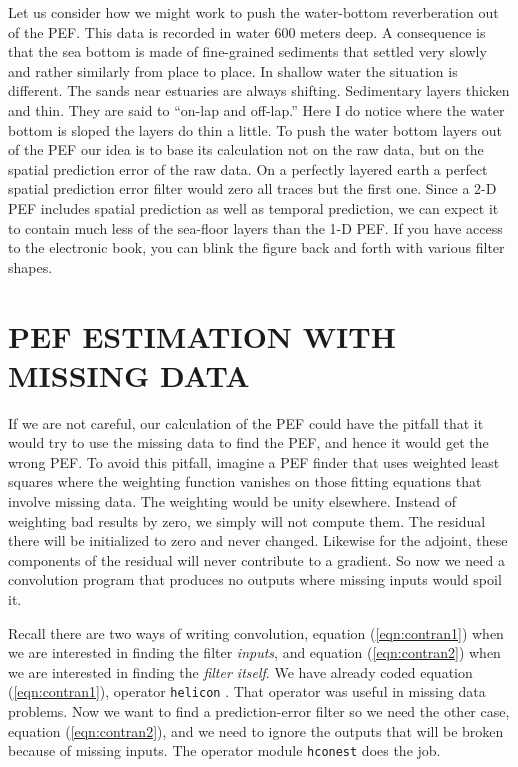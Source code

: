 
\par
Let us consider how we might work
to push the water-bottom reverberation out of the PEF.
This data is recorded in water 600 meters deep.
A consequence is that the sea bottom is made of fine-grained sediments
that settled very slowly and rather similarly from place to place.
In shallow water the situation is different.
The sands near estuaries are always shifting.
Sedimentary layers thicken and thin.
They are said to ``on-lap and off-lap.''
Here I do notice where the water bottom is sloped
the layers do thin a little.
To push the water bottom layers out of the PEF
our idea is to base its calculation not on the raw data,
but on the spatial prediction error of the raw data.
On a perfectly layered earth
a perfect spatial prediction error filter would zero all traces
but the first one.
Since a 2-D PEF includes spatial prediction as well as temporal
prediction, we can expect it to contain much less of the sea-floor
layers than the 1-D PEF.
If you have access to the electronic book, you can blink
the figure back and forth with various filter shapes.





\section{PEF ESTIMATION WITH MISSING DATA}
\par
If we are not careful,
our calculation of the PEF
could have the pitfall that it would try to use the missing
data to find the PEF, and hence it would get the wrong PEF.
To avoid this pitfall,
imagine a PEF finder that uses weighted least squares
where the weighting function vanishes on
those fitting equations that involve missing data.
The weighting would be unity elsewhere.
Instead of weighting bad results by zero,
we simply will not compute them.
The residual there will be initialized to zero and
never changed.
Likewise for the adjoint,
these components of the residual will never contribute to a gradient.
So now we need a convolution program that
produces no outputs where missing inputs would spoil it.

\par
Recall there are two ways of writing convolution,
equation (\ref{eqn:contran1})
when we are interested in finding the filter
{\em inputs}, and
equation (\ref{eqn:contran2})
when we are interested in finding the
{\em filter itself}.
We have already coded
equation (\ref{eqn:contran1}),
operator
\texttt{helicon} .
That operator was useful in missing data problems.
Now we want to find a prediction-error filter
so we need the other case,
equation (\ref{eqn:contran2}),
and we need to ignore the outputs
that will be broken because of missing inputs.
The operator module
\texttt{hconest} does the job.

